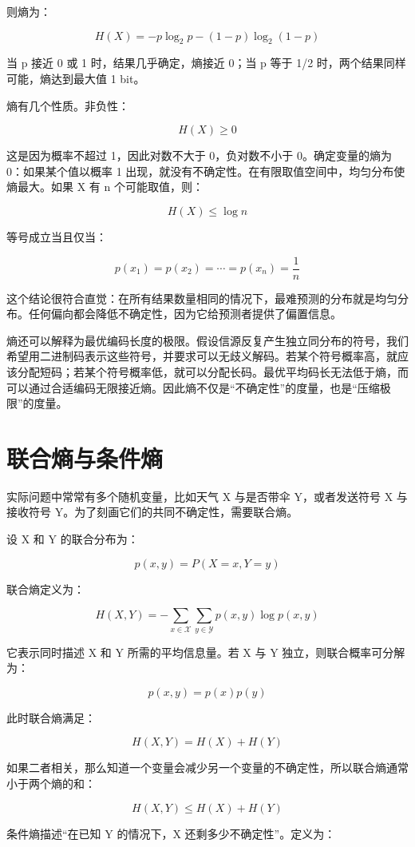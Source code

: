 则熵为：

\[
H(X)=-p\log_2 p-(1-p)\log_2(1-p)
\]

当 p 接近 0 或 1 时，结果几乎确定，熵接近 0；当 p 等于 1/2 时，两个结果同样可能，熵达到最大值 1 bit。

熵有几个性质。非负性：

\[
H(X)\ge 0
\]

这是因为概率不超过 1，因此对数不大于 0，负对数不小于 0。确定变量的熵为 0：如果某个值以概率 1 出现，就没有不确定性。在有限取值空间中，均匀分布使熵最大。如果 X 有 n 个可能取值，则：

\[
H(X)\le \log n
\]

等号成立当且仅当：

\[
p(x_1)=p(x_2)=\cdots=p(x_n)=\frac{1}{n}
\]

这个结论很符合直觉：在所有结果数量相同的情况下，最难预测的分布就是均匀分布。任何偏向都会降低不确定性，因为它给预测者提供了偏置信息。

熵还可以解释为最优编码长度的极限。假设信源反复产生独立同分布的符号，我们希望用二进制码表示这些符号，并要求可以无歧义解码。若某个符号概率高，就应该分配短码；若某个符号概率低，就可以分配长码。最优平均码长无法低于熵，而可以通过合适编码无限接近熵。因此熵不仅是“不确定性”的度量，也是“压缩极限”的度量。

\section{联合熵与条件熵}

实际问题中常常有多个随机变量，比如天气 X 与是否带伞 Y，或者发送符号 X 与接收符号 Y。为了刻画它们的共同不确定性，需要联合熵。

设 X 和 Y 的联合分布为：

\[
p(x,y)=P(X=x,Y=y)
\]

联合熵定义为：

\[
H(X,Y)=-\sum_{x\in\mathcal{X}}\sum_{y\in\mathcal{Y}}p(x,y)\log p(x,y)
\]

它表示同时描述 X 和 Y 所需的平均信息量。若 X 与 Y 独立，则联合概率可分解为：

\[
p(x,y)=p(x)p(y)
\]

此时联合熵满足：

\[
H(X,Y)=H(X)+H(Y)
\]

如果二者相关，那么知道一个变量会减少另一个变量的不确定性，所以联合熵通常小于两个熵的和：

\[
H(X,Y)\le H(X)+H(Y)
\]

条件熵描述“在已知 Y 的情况下，X 还剩多少不确定性”。定义为：

